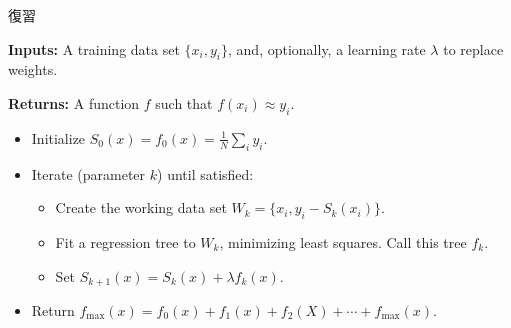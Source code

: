 \begin{frame}{復習}

\textbf{Inputs:} A training data set $\{ x_i, y_i \}$, and, optionally, a learning rate $\lambda$ to replace weights.

\textbf{Returns:} A function $f$ such that $f(x_i) \approx y_i$.

\begin{itemize}
  \item Initialize $S_0(x) = f_0(x) = \frac{1}{N} \sum_i y_i$.
  \item Iterate (parameter $k$) until satisfied: \begin{itemize}
    \item Create the working data set $W_k = \{ x_i, y_i - S_{k}(x_i) \}$.
    \item Fit a regression tree to $W_k$, minimizing least squares.  Call this tree $f_k$.
    \item Set $S_{k+1}(x) = S_{k}(x) + \lambda f_{k}(x)$. 
  \end{itemize}
  \item Return $f_{\text{max}}(x) = f_0(x) + f_1(x) + f_2(X) + \cdots + f_{\text{max}}(x)$.
\end{itemize}

\end{frame}
%